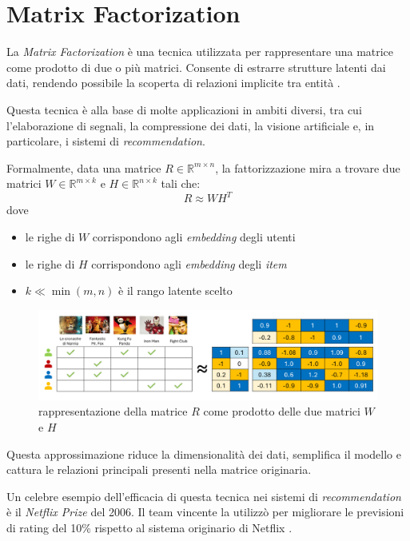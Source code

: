 \section{Matrix Factorization}\label{matrix_factorization}

La \textit{Matrix Factorization} è una tecnica utilizzata per rappresentare una matrice come prodotto di due o più matrici. Consente di estrarre strutture latenti dai dati, rendendo possibile la scoperta di relazioni implicite tra entità \cite{MC}.

Questa tecnica è alla base di molte applicazioni in ambiti diversi, tra cui l'elaborazione di segnali, la compressione dei dati, la visione artificiale e, in particolare, i sistemi di \textit{recommendation}.

Formalmente, data una matrice $R \in \mathbb{R}^{m \times n}$, la fattorizzazione mira a trovare due matrici $W \in \mathbb{R}^{m \times k}$ e $H \in \mathbb{R}^{n \times k}$ tali che:
\[
R \approx WH^T
\]
dove 
\begin{itemize}
    \item le righe di $W$ corrispondono agli \textit{embedding} degli utenti
    \item le righe di $H$ corrispondono agli \textit{embedding} degli \textit{item}
    \item $k \ll \min(m,n)$ è il rango latente scelto
\end{itemize}

\begin{figure}[H]
    \centering
    \includegraphics[scale=0.5]{figures/matrix_factorization.PNG}
    \caption{rappresentazione della matrice $R$ come prodotto delle due matrici $W$ e $H$}
    \label{fig:matrix_factorization}
\end{figure}

Questa approssimazione riduce la dimensionalità dei dati, semplifica il modello e cattura le relazioni principali presenti nella matrice originaria.

Un celebre esempio dell'efficacia di questa tecnica nei sistemi di \textit{recommendation} è il \textit{Netflix Prize} del 2006. Il team vincente la utilizzò per migliorare le previsioni di rating del 10\% rispetto al sistema originario di Netflix \cite{TheNP}.

